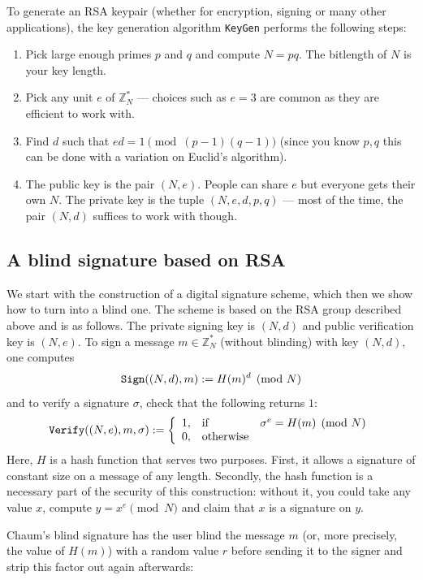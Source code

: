 \documentclass[envcountsame]{llncs}
\newcommand{\alg}[1]{\textup{\texttt{#1}}}
\newenvironment{maths}{\begin{framed}
\vspace{-12pt}
\begin{figure}
\vspace{-12pt}\quad{\Huge $\sum$}
\end{figure}}{\end{framed}}
\begin{document}
\begin{maths}
To generate an RSA keypair (whether for encryption, signing or many other
applications), the key generation algorithm \alg{KeyGen} performs the following
steps:
\begin{enumerate}
\item Pick large enough primes $p$ and $q$ and compute $N = pq$. The bitlength
of $N$ is your key length.
\item Pick any unit $e$ of $\mathbb Z^*_N$ --- choices such as $e = 3$ are
common as they are efficient to work with.
\item Find $d$ such that $ed = 1 \pmod{(p-1)(q-1)}$ (since you know $p, q$ this
can be done with a variation on Euclid's algorithm).
\item The public key is the pair $(N, e)$. People can share $e$ but everyone
gets their own $N$. The private key is the tuple $(N, e, d, p, q)$ --- most of
the time, the pair $(N, d)$ suffices to work with though.
\end{enumerate}
\end{maths}

\subsection{A blind signature based on RSA}
We start with the construction of a digital signature  scheme, which then we show how to turn into a blind one.  The scheme is based on the RSA group described above and is as follows.   The private signing key is $(N, d)$ and public verification key is $(N, e)$.  To sign a message $m \in \mathbb Z^*_N$ (without blinding) with key $(N, d)$, one computes
\[
\alg{Sign}((N, d), m) := H(m)^d \pmod{N}
\]
and to verify a signature $\sigma$, check that the following returns $1$:
\[
\alg{Verify}((N, e), m, \sigma) :=
\left\{ \begin{array}{lll}
1, & \textrm{if} & \sigma^e = H(m) \pmod{N} \\
0, & \textrm{otherwise} & \\
\end{array} \right.
\]
Here, $H$ is a hash function that serves two purposes. First, it allows a signature of
constant size on a message of any length. Secondly, the hash function is a
necessary part of the security of this construction: without it, you could take
any value $x$, compute $y = x^e \pmod{N}$ and claim that $x$ is a signature on
$y$.

Chaum's blind signature has the user blind the message $m$ (or, more precisely, the value of $H(m)$) with a random value
$r$ before sending it to the signer and strip this factor out again afterwards:
\end{document}
